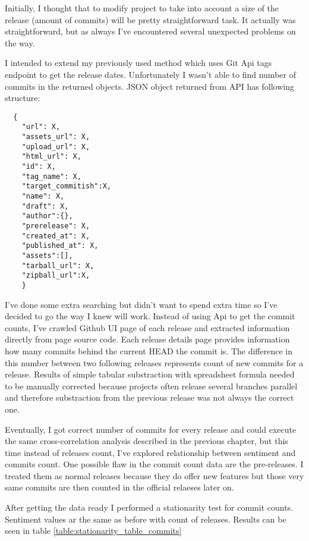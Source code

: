 Initially, I thought that to modify project to take into account a size of the release (amount of commits) will be pretty straightforward task. It actually was straightforward, but as always I've encountered several unexpected problems on the way. 

I intended to extend my previously used method which uses Git Api tags endpoint to get the release dates. Unfortunately I wasn't able to find number of commits in the returned objects. JSON object returned from API has following structure:

\begin{lstlisting}
  {
    "url": X,
    "assets_url": X,
    "upload_url": X,
    "html_url": X,
    "id": X,
    "tag_name": X,
    "target_commitish":X,
    "name": X,
    "draft": X,
    "author":{},
    "prerelease": X,
    "created_at": X,
    "published_at": X,
    "assets":[],
    "tarball_url": X,
    "zipball_url":X, 
    }
\end{lstlisting}

I've done some extra searching but didn't want to spend extra time so I've decided to go the way I knew will work. Instead of using Api to get the commit counts, I've crawled Github UI page of each release and extracted information directly from page source code. Each release details page provides information how many commits behind the current HEAD the commit is. The difference in this number between two following releases represents count of new commits for a release. Results of simple tabular substraction with spreadsheet formula needed to be manually corrected because projects often release several branches parallel and therefore substraction from the previous release was not always the correct one.

Eventually, I got correct number of commits for every release and could execute the same cross-correlation analysis described in the previous chapter, but this time instead of releases count, I've explored relationship between sentiment and commits count. One possible flaw in the commit count data are the pre-releases. I treated them as normal releases because they do offer new features but those very same commits are then counted in the official relaeses later on.

After getting the data ready I performed a stationarity test for commit counts. Sentiment values ar the same as before with count of releases. Results can be seen in table \ref{table:stationarity_table_commits} 

